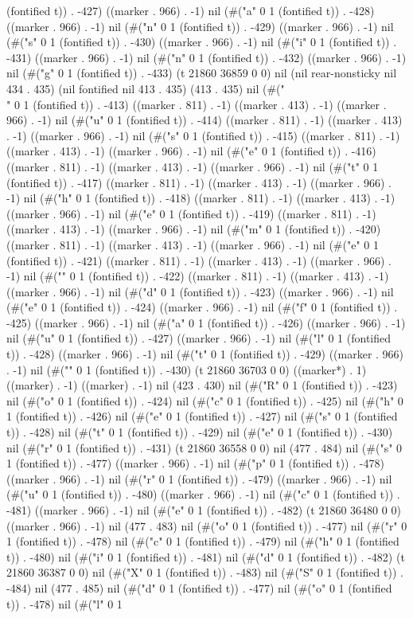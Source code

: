 (fontified t)) . -427) ((marker . 966) . -1) nil (#("a" 0 1 (fontified t)) . -428) ((marker . 966) . -1) nil (#("n" 0 1 (fontified t)) . -429) ((marker . 966) . -1) nil (#("s" 0 1 (fontified t)) . -430) ((marker . 966) . -1) nil (#("i" 0 1 (fontified t)) . -431) ((marker . 966) . -1) nil (#("n" 0 1 (fontified t)) . -432) ((marker . 966) . -1) nil (#("g" 0 1 (fontified t)) . -433) (t 21860 36859 0 0) nil (nil rear-nonsticky nil 434 . 435) (nil fontified nil 413 . 435) (413 . 435) nil (#("\\" 0 1 (fontified t)) . -413) ((marker . 811) . -1) ((marker . 413) . -1) ((marker . 966) . -1) nil (#("u" 0 1 (fontified t)) . -414) ((marker . 811) . -1) ((marker . 413) . -1) ((marker . 966) . -1) nil (#("s" 0 1 (fontified t)) . -415) ((marker . 811) . -1) ((marker . 413) . -1) ((marker . 966) . -1) nil (#("e" 0 1 (fontified t)) . -416) ((marker . 811) . -1) ((marker . 413) . -1) ((marker . 966) . -1) nil (#("t" 0 1 (fontified t)) . -417) ((marker . 811) . -1) ((marker . 413) . -1) ((marker . 966) . -1) nil (#("h" 0 1 (fontified t)) . -418) ((marker . 811) . -1) ((marker . 413) . -1) ((marker . 966) . -1) nil (#("e" 0 1 (fontified t)) . -419) ((marker . 811) . -1) ((marker . 413) . -1) ((marker . 966) . -1) nil (#("m" 0 1 (fontified t)) . -420) ((marker . 811) . -1) ((marker . 413) . -1) ((marker . 966) . -1) nil (#("e" 0 1 (fontified t)) . -421) ((marker . 811) . -1) ((marker . 413) . -1) ((marker . 966) . -1) nil (#("{" 0 1 (fontified t)) . -422) ((marker . 811) . -1) ((marker . 413) . -1) ((marker . 966) . -1) nil (#("d" 0 1 (fontified t)) . -423) ((marker . 966) . -1) nil (#("e" 0 1 (fontified t)) . -424) ((marker . 966) . -1) nil (#("f" 0 1 (fontified t)) . -425) ((marker . 966) . -1) nil (#("a" 0 1 (fontified t)) . -426) ((marker . 966) . -1) nil (#("u" 0 1 (fontified t)) . -427) ((marker . 966) . -1) nil (#("l" 0 1 (fontified t)) . -428) ((marker . 966) . -1) nil (#("t" 0 1 (fontified t)) . -429) ((marker . 966) . -1) nil (#("}" 0 1 (fontified t)) . -430) (t 21860 36703 0 0) ((marker*) . 1) ((marker) . -1) ((marker) . -1) nil (423 . 430) nil (#("R" 0 1 (fontified t)) . -423) nil (#("o" 0 1 (fontified t)) . -424) nil (#("c" 0 1 (fontified t)) . -425) nil (#("h" 0 1 (fontified t)) . -426) nil (#("e" 0 1 (fontified t)) . -427) nil (#("s" 0 1 (fontified t)) . -428) nil (#("t" 0 1 (fontified t)) . -429) nil (#("e" 0 1 (fontified t)) . -430) nil (#("r" 0 1 (fontified t)) . -431) (t 21860 36558 0 0) nil (477 . 484) nil (#("s" 0 1 (fontified t)) . -477) ((marker . 966) . -1) nil (#("p" 0 1 (fontified t)) . -478) ((marker . 966) . -1) nil (#("r" 0 1 (fontified t)) . -479) ((marker . 966) . -1) nil (#("u" 0 1 (fontified t)) . -480) ((marker . 966) . -1) nil (#("c" 0 1 (fontified t)) . -481) ((marker . 966) . -1) nil (#("e" 0 1 (fontified t)) . -482) (t 21860 36480 0 0) ((marker . 966) . -1) nil (477 . 483) nil (#("o" 0 1 (fontified t)) . -477) nil (#("r" 0 1 (fontified t)) . -478) nil (#("c" 0 1 (fontified t)) . -479) nil (#("h" 0 1 (fontified t)) . -480) nil (#("i" 0 1 (fontified t)) . -481) nil (#("d" 0 1 (fontified t)) . -482) (t 21860 36387 0 0) nil (#("X" 0 1 (fontified t)) . -483) nil (#("S" 0 1 (fontified t)) . -484) nil (477 . 485) nil (#("d" 0 1 (fontified t)) . -477) nil (#("o" 0 1 (fontified t)) . -478) nil (#("l" 0 1 